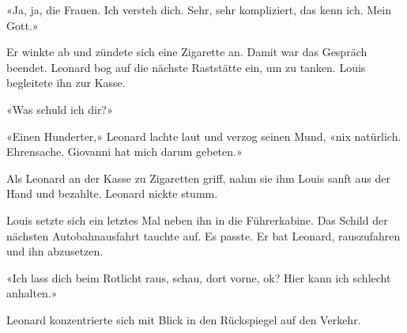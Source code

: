 «Ja, ja, die Frauen. Ich versteh dich. Sehr, sehr kompliziert, das kenn
ich. Mein Gott.»

Er winkte ab und zündete sich eine Zigarette an.
Damit war das Gespräch beendet.
Leonard bog auf die nächste Raststätte ein, um zu tanken.
Louis begleitete ihn zur Kasse.

«Was schuld ich dir?»

«Einen Hunderter,» Leonard lachte laut und verzog seinen Mund,
«nix natürlich. Ehrensache. Giovanni hat mich darum gebeten.»

Als Leonard an der Kasse zu Zigaretten griff, nahm sie ihm Louis sanft
aus der Hand und bezahlte. Leonard nickte stumm.

Louis setzte sich ein letztes Mal neben ihn in die Führerkabine.
Das Schild der nächsten Autobahnausfahrt tauchte auf. Es passte. Er bat
Leonard, rauszufahren und ihn abzusetzen.

«Ich lass dich beim Rotlicht raus, schau, dort vorne, ok? Hier kann ich
schlecht anhalten.»

Leonard konzentrierte sich mit Blick in den Rückspiegel auf den Verkehr.
